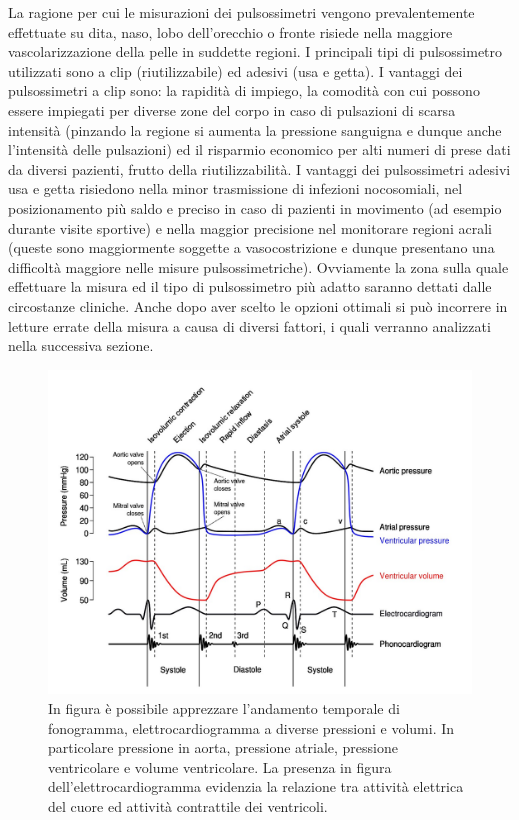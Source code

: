 \documentclass[a4paper, 12pt]{book}
\begin{document}
La ragione per cui le misurazioni dei pulsossimetri vengono prevalentemente effettuate su dita, naso, lobo dell'orecchio o fronte risiede nella maggiore vascolarizzazione della pelle in suddette regioni.
I principali tipi di pulsossimetro utilizzati sono a clip (riutilizzabile) ed adesivi (usa e getta).
I vantaggi dei pulsossimetri a clip sono: la rapidità di impiego, la comodità con cui possono essere impiegati per diverse zone del corpo in caso di pulsazioni di scarsa intensità (pinzando la regione si aumenta la pressione sanguigna e dunque anche l'intensità delle pulsazioni) ed il risparmio economico per alti numeri di prese dati da diversi pazienti, frutto della riutilizzabilità.
I vantaggi dei pulsossimetri adesivi usa e getta risiedono nella minor trasmissione di infezioni nocosomiali, nel posizionamento più saldo e preciso in caso di pazienti in movimento (ad esempio durante visite sportive) e nella maggior precisione nel monitorare regioni acrali (queste sono maggiormente soggette a vasocostrizione e dunque presentano una difficoltà maggiore nelle misure pulsossimetriche).
Ovviamente la zona sulla quale effettuare la misura ed il tipo di pulsossimetro più adatto saranno dettati dalle circostanze cliniche.
Anche dopo aver scelto le opzioni ottimali si può incorrere in letture errate della misura a causa di diversi fattori, i quali verranno analizzati nella successiva sezione.

\begin{figure}[h!]
	\includegraphics[width=\textwidth]{Wiggers_Diagram.jpg}
	\caption{In figura è possibile apprezzare l'andamento temporale di fonogramma, 					 	 elettrocardiogramma a diverse pressioni e volumi.
			 In particolare pressione in aorta, pressione atriale, pressione 							 ventricolare e volume ventricolare.
			 La presenza in figura dell'elettrocardiogramma evidenzia la relazione tra 				 	 attività elettrica del cuore ed attività contrattile dei ventricoli.}
	\label{fig:Wiggers_Diagram}
\end{figure}
\end{document}
